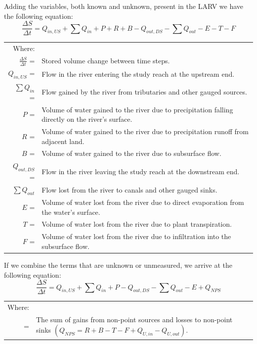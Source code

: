 \begin{linenumbers}
Adding the variables, both known and unknown, present in the LARV we have the following equation:
\begin{equation}
	\frac{\Delta S}{\Delta t} = Q_{in,US} + \sum Q_{in} + P + R + B - Q_{out,DS} - \sum Q_{out} - E - T - F 
\end{equation}
\begin{longtable}{rl}
	Where: \\
	$\frac{\Delta S}{\Delta t}$ =&Stored volume change between time steps.\\
	$ Q_{in,US} $ = & Flow in the river entering the study reach at the upstream end.\\
	$ \sum Q_{in} $ = & Flow gained by the river from tributaries and other gauged sources.\\
	$ P $ = & Volume of water gained to the river due to precipitation falling directly on the river's surface.\\
	$ R $ = & Volume of water gained to the river due to precipitation runoff from adjacent land. \\
	$ B $ = & Volume of water gained to the river due to subsurface flow. \\
	$ Q_{out,DS} $ = & Flow in the river leaving the study reach at the downstream end.\\
	$ \sum Q_{out} $ & Flow lost from the river to canals and other gauged sinks.\\
	$ E $ = & Volume of water lost from the river due to direct evaporation from the water's surface.\\
	$ T $ = & Volume of water lost from the river due to plant transpiration.\\
	$ F $ = & Volume of water lost from the river due to infiltration into the subsurface flow.\\
\end{longtable}

If we combine the terms that are unknown or unmeasured, we arrive at the following equation:
\begin{equation}\label{eq:water01}
	\frac{\Delta S}{\Delta t} = Q_{in,US} + \sum Q_{in} + P - Q_{out,DS} - \sum Q_{out} - E + Q_{NPS}
\end{equation}
\begin{tabularx}{6in}{rX}
	Where: \\
	\Qnps = & The sum of gains from non-point sources and losses to non-point sinks $ \left( Q_{NPS} = R + B - T - F + Q_{U,in} - Q_{U,out}\right) $.\\ 
\end{tabularx}\\


\end{linenumbers}
